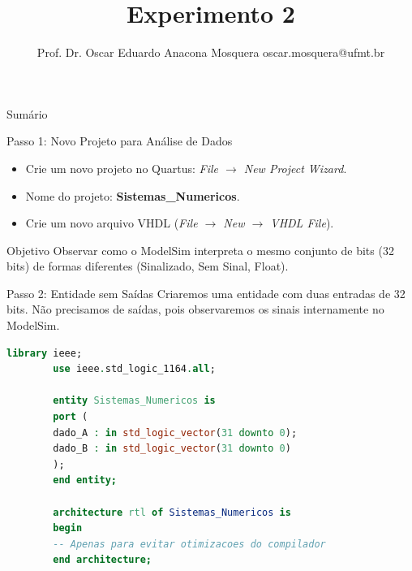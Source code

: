 \documentclass[aspectratio=169]{beamer}
\title[Arquitetura de Computadores]{\huge  Experimento 2} %
\author[Prof. Dr. Oscar Eduardo Anacona Mosquera]{Prof. Dr. Oscar Eduardo Anacona Mosquera \newline\newline 
	\scriptsize{oscar.mosquera@ufmt.br}
}%
\begin{document}
	\begin{frame}[plain]
		\titlepage
	\end{frame}
	
	\begin{frame}{Sumário}
		\tableofcontents
	\end{frame}
	

\begin{frame}{Passo 1: Novo Projeto para Análise de Dados}
	\begin{itemize}
		\item Crie um novo projeto no Quartus: \textit{File $\rightarrow$ New Project Wizard}.
		\item Nome do projeto: \textbf{Sistemas\_Numericos}.
		\item Crie um novo arquivo VHDL (\textit{File $\rightarrow$ New $\rightarrow$ VHDL File}).
	\end{itemize}
	\begin{block}{Objetivo}
		Observar como o ModelSim interpreta o mesmo conjunto de bits (32 bits) de formas diferentes (Sinalizado, Sem Sinal, Float).
	\end{block}
\end{frame}

\begin{frame}[fragile]{Passo 2: Entidade sem Saídas}
	\justifying
	Criaremos uma entidade com duas entradas de 32 bits. Não precisamos de saídas, pois observaremos os sinais internamente no ModelSim.
	
	\begin{lstlisting}[language=VHDL, basicstyle=\tiny]
		library ieee;
		use ieee.std_logic_1164.all;
		
		entity Sistemas_Numericos is
		port (
		dado_A : in std_logic_vector(31 downto 0);
		dado_B : in std_logic_vector(31 downto 0)
		);
		end entity;
		
		architecture rtl of Sistemas_Numericos is
		begin
		-- Apenas para evitar otimizacoes do compilador
		end architecture;
	\end{lstlisting}
\end{frame}
\end{document}

